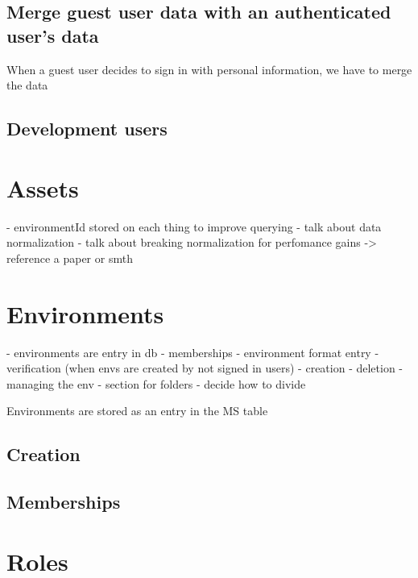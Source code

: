 \subsection{Merge guest user data with an authenticated user's data}
\label{cha:ms-architecture:merge-guest-user-data}

When a guest user decides to sign in with personal information, we have to merge the data

\subsection{Development users}
\label{cha:ms-architecture:users:development-users}

\section{Assets}

- environmentId stored on each thing to improve querying
- talk about data normalization
- talk about breaking normalization for perfomance gains -> reference a paper or smth

\section{Environments}

- environments are entry in db
- memberships
- environment format entry
- verification (when envs are created by not signed in users)
- creation
- deletion - managing the env
- section for folders
- decide how to divide 

Environments are stored as an entry in the MS table


\subsection{Creation}
\subsection{Memberships}

\section{Roles}


